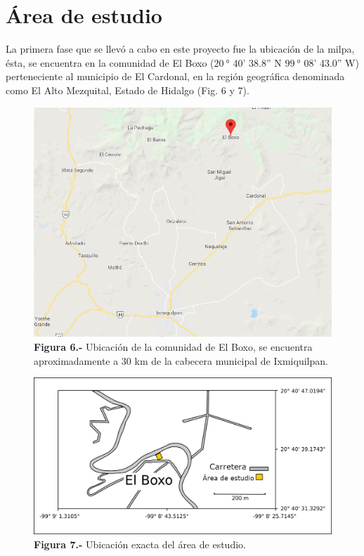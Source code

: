 \documentclass[12pt,letterpaper,oneside]{report}
\begin{document}
\section{Área de estudio}
La primera fase que se llevó a cabo en este proyecto fue la ubicación de la milpa, ésta, se encuentra en la comunidad de El Boxo ($\SI{20}{\degree}$ 40' 38.8'' N $\SI{99}{\degree}$ 08' 43.0'' W) perteneciente al municipio de El Cardonal, en la región geográfica denominada como El Alto Mezquital, Estado de Hidalgo (Fig. 6 y 7).
\begin{figure}[!h]
\centering
\includegraphics[width=14.13cm]{figuras/IMG_7}
\caption*{\textbf{Figura 6.-} Ubicación de la comunidad de El Boxo, se encuentra aproximadamente a 30 km de la cabecera municipal de Ixmiquilpan.}
\label{Figura 7}
\end{figure}
\begin{figure}[!h]
\centering
\includegraphics[width=15.03cm]{figuras/IMG_8}
\caption*{\textbf{Figura 7.-} Ubicación exacta del área de estudio.}
\label{Figura 8}
\end{figure}
\end{document}
